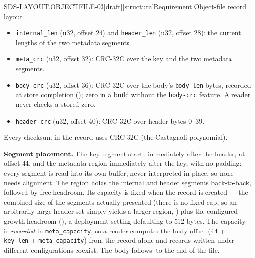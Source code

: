 \begin{requirement}{SDS-LAYOUT.OBJECTFILE-03}[draft][structuralRequirement]{Object-file record layout}
\begin{itemize}
      \texttt{primary} (16 bytes) is
      fixed-size,\footnote{ is a \texttt{[u8; 16]}.} while
      \texttt{variance}\footnote{: absent for a key with no \texttt{Vary}
      variant, 16 bytes when present.} is present or absent per key and
      \texttt{user\_tag}\footnote{, ``the len should be small to keep memory usage bounded''
      per its own source comment --- guidance, not a fixed width.} is an
      arbitrary-length string; \texttt{key\_len} is what lets a reader
      locate the metadata region without assuming a size. The key segment's
      encoding is 's.
    \item \texttt{internal\_len} (u32, offset 24) and \texttt{header\_len}
      (u32, offset 28): the current lengths of the two metadata segments.
    \item \texttt{meta\_crc} (u32, offset 32): CRC-32C over the key and the
      two metadata segments.
    \item \texttt{body\_crc} (u32, offset 36): CRC-32C over the body's
      \texttt{body\_len} bytes, recorded at store completion
      (); zero in a build without the
      \texttt{body-crc} feature. A reader never checks a stored zero.
    \item \texttt{header\_crc} (u32, offset 40): CRC-32C over header bytes
      0--39.
  \end{itemize}
  Every checksum in the record uses CRC-32C (the Castagnoli polynomial).

  \textbf{Segment placement.} The key segment starts immediately after the
  header, at offset 44, and the metadata region immediately after the key,
  with no padding: every segment is read into its own buffer, never
  interpreted in place, so none needs alignment. The region holds the
  internal and header segments back-to-back, followed by free headroom. Its capacity is fixed when the
  record is created --- the combined size of the segments actually presented
  (there is no fixed cap, so an arbitrarily large header set simply yields a
  larger region, ) plus the configured
  growth headroom (), a deployment setting
  defaulting to 512 bytes. The capacity is
  \emph{recorded} in \texttt{meta\_capacity}, so a reader computes the body
  offset (44 + \texttt{key\_len} + \texttt{meta\_capacity}) from the record
  alone and records written under
  different configurations coexist. The body follows, to the end of the file.


\end{requirement}
